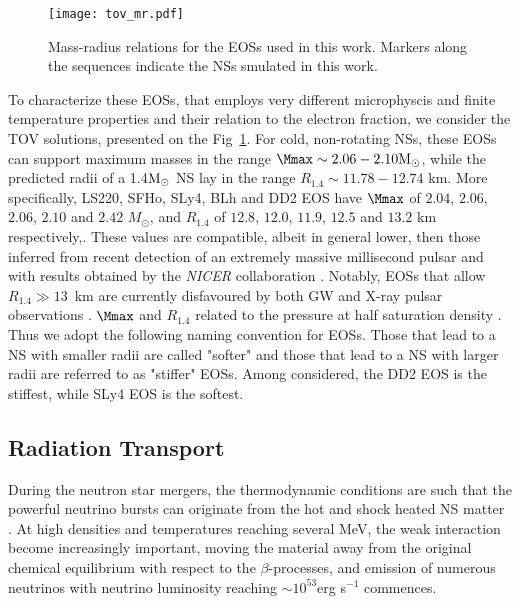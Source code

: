 \begin{figure}[t]
    \centering 
    \texttt{[image: tov\_mr.pdf]}
    \caption{Mass-radius relations for the EOSs used in this work. 
        Markers along the sequences indicate the NSs smulated in this work.}  
    \label{fig:method:tov_mr}
\end{figure}
To characterize these \acp{EOS}, that employs very different microphyscis and finite 
temperature properties and their relation to the electron fraction, we consider the \ac{TOV} solutions, 
presented on the Fig~\ref{fig:method:tov_mr}.
%
For cold, non-rotating \acp{NS}, these \acp{EOS} can support maximum 
masses in the range $\Mmax\sim 2.06-2.10\Msun$, while the predicted radii of a 1.4${\text{M}_{\odot}}$ 
NS lay in the range $R_{1.4}\sim 11.78-12.74$ km. 
More specifically, LS220, SFHo, SLy4, BLh and DD2 EOS have 
$\Mmax$ of $2.04$, $2.06$, $2.06$, $2.10$ and $2.42$ $M_\odot$, and 
$R_{1.4}$ of $12.8$, $12.0$, $11.9$, $12.5$ and $13.2$ km respectively,.
%
These values are compatible, albeit in general lower, then those inferred from 
recent detection of an extremely massive millisecond pulsar \citep{Cromartie:2019kug} and with results obtained 
by the {\it NICER} collaboration \citep{Miller:2019cac,Riley:2019yda}.
Notably, \acp{EOS} that allow $R_{1.4}\gg 13$~km are currently disfavoured by both 
GW  and X-ray pulsar observations \citep{Abbott:2018wiz,Miller:2019cac,Riley:2019yda}.
%
$\Mmax$ and $R_{1.4}$ related to the pressure at half saturation density \citep{Lattimer:2012nd}.
Thus we adopt the following naming convention for \acp{EOS}. Those that lead to a \ac{NS} with smaller 
radii are called "softer" and those that lead to a NS with larger radii are referred to as "stiffer" \acp{EOS}. 
Among considered, the DD2 \ac{EOS} is the stiffest, while SLy4 \ac{EOS} is the softest.






\subsection{Radiation Transport}

During the neutron star mergers, the thermodynamic conditions are such that the powerful 
neutrino bursts can originate from the hot and shock heated NS matter \citep[\eg][]{Sekiguchi:2011zd}.
At high densities and temperatures reaching several MeV, the weak interaction become increasingly important,
moving the material away from the original chemical equilibrium with respect to the 
$\beta$-processes, and emission of numerous neutrinos with neutrino luminosity 
reaching $\sim10^{53}$erg s$^{-1}$ commences. 

